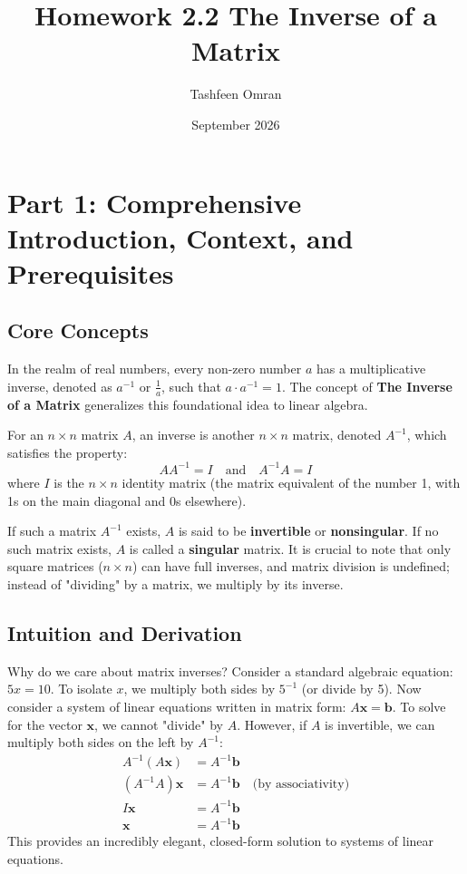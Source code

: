 \documentclass[11pt]{article}
\title{\textbf{Homework 2.2 The Inverse of a Matrix}}
\author{Tashfeen Omran}
\date{September 2026}
\begin{document}
\maketitle

\tableofcontents
\newpage

\section{Part 1: Comprehensive Introduction, Context, and Prerequisites}

\subsection{Core Concepts}
In the realm of real numbers, every non-zero number $a$ has a multiplicative inverse, denoted as $a^{-1}$ or $\frac{1}{a}$, such that $a \cdot a^{-1} = 1$. The concept of \textbf{The Inverse of a Matrix} generalizes this foundational idea to linear algebra. 

For an $n \times n$ matrix $A$, an inverse is another $n \times n$ matrix, denoted $A^{-1}$, which satisfies the property:
\[ A A^{-1} = I \quad \text{and} \quad A^{-1} A = I \]
where $I$ is the $n \times n$ identity matrix (the matrix equivalent of the number 1, with 1s on the main diagonal and 0s elsewhere). 

If such a matrix $A^{-1}$ exists, $A$ is said to be \textbf{invertible} or \textbf{nonsingular}. If no such matrix exists, $A$ is called a \textbf{singular} matrix. It is crucial to note that only square matrices ($n \times n$) can have full inverses, and matrix division is undefined; instead of "dividing" by a matrix, we multiply by its inverse.

\subsection{Intuition and Derivation}
Why do we care about matrix inverses? Consider a standard algebraic equation: $5x = 10$. To isolate $x$, we multiply both sides by $5^{-1}$ (or divide by 5). 
Now consider a system of linear equations written in matrix form: $A\mathbf{x} = \mathbf{b}$. To solve for the vector $\mathbf{x}$, we cannot "divide" by $A$. However, if $A$ is invertible, we can multiply both sides on the left by $A^{-1}$:
\begin{align*}
    A^{-1}(A\mathbf{x}) &= A^{-1}\mathbf{b} \\
    (A^{-1}A)\mathbf{x} &= A^{-1}\mathbf{b} \quad \text{(by associativity)} \\
    I\mathbf{x} &= A^{-1}\mathbf{b} \\
    \mathbf{x} &= A^{-1}\mathbf{b}
\end{align*}
This provides an incredibly elegant, closed-form solution to systems of linear equations. 
\end{document}
